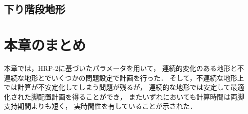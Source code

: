 \documentclass[autodetect-engine,dvipdfmx-if-dvi,ja=standard,a4j,jbase=11pt,magstyle=nomag*]{bxjsreport}
\begin{document}
\subsection{下り階段地形}


\section{本章のまとめ}
本章では，HRP-2に基づいたパラメータを用いて，
連続的変化のある地形と不連続な地形とでいくつかの問題設定で計画を行った．
そして，不連続な地形上では計算が不安定化してしまう問題が残るが，
連続的な地形では安定して最適化された脚配置計画を得ることができ，
またいずれにおいても計算時間は両脚支持期間よりも短く，
実時間性を有していることが示された．
\end{document}

